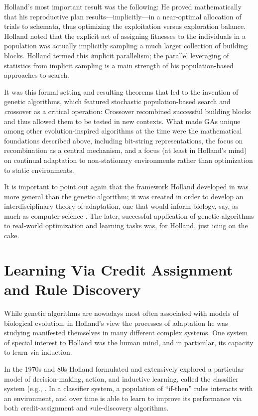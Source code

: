 \documentclass{sig-alternate}
\begin{document}
Holland's most important result was the following: He proved
mathematically that his reproductive plan results---implicitly---in a
near-optimal allocation of trials to schemata, thus optimizing the
exploitation versus exploration balance.  Holland noted that the
explicit act of assigning fitnesses to the individuals in a population
was actually implicitly sampling a much larger collection of building
blocks.  Holland termed this {\emph implicit parallelism}; the
parallel leveraging of statistics from implicit sampling is a main
strength of his population-based approaches to search.

It was this formal setting and resulting theorems that led to the
invention of genetic algorithms, which featured stochastic
population-based search and {\emph crossover} as a critical
operation: Crossover recombined successful building blocks and
thus allowed them to be tested in new contexts.  What made GAs unique
among other evolution-inspired algorithms at the time were the
mathematical foundations described above, including bit-string
representations, the focus on recombination as a central mechanism,
and a focus (at least in Holland's mind) on continual adaptation to
non-stationary environments rather than optimization to static
environments.

It is important to point out again that the framework Holland
developed in \cite{Holland1975} was more general than the genetic algorithm;
it was created in order to develop an interdisciplinary theory of
adaptation, one that would inform biology, say, as much as computer
science \cite{Christiansen1998}.  The later, successful
application of genetic algorithms to real-world optimization and
learning tasks was, for Holland, just icing on the cake.

\section{Learning Via Credit Assignment and Rule Discovery}

While genetic algorithms are nowadays most often associated with models of
biological evolution, in Holland's view the processes of adaptation he
was studying manifested themselves in many different complex systems.
One system of special interest to Holland was the human mind, and in
particular, its capacity to learn via induction.

In the 1970s and 80s Holland formulated and extensively explored a
particular model of decision-making, action, and inductive learning,
called the {\emph classifier system} (e.g.,
\cite{Holland1977,Holland1986}.  In a classifier system, a population
of ``if-then'' rules interacts with an environment, and over time is
able to learn to improve its performance via both {\emph
  credit-assignment} and {\emph rule-discovery} algorithms.
\end{document}
